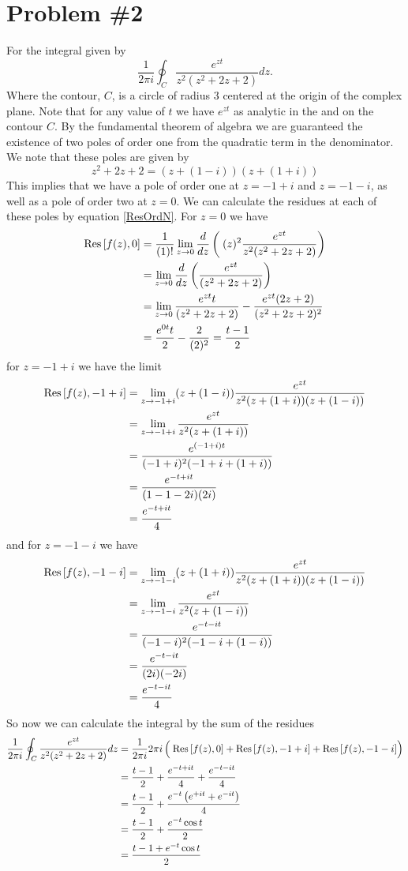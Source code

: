\documentclass[11pt]{article}
\numberwithin{equation}{section}
\begin{document}
\section{Problem \#2}
For the integral given by
$$\frac{1}{2\pi{i}}\oint_{C} \frac{e^{zt}}{z^2(z^2+2z+2)}dz.$$
Where the contour, $C$, is a circle of radius $3$ centered at the origin of the complex plane.
Note that for any value of $t$ we have $e^{zt}$ as analytic in the and on the contour $C$.
By the fundamental theorem of algebra we are guaranteed the existence of two poles of order 
one from the quadratic term in the denominator. We note that these poles are given by 
$$z^2+2z+2 = (z+(1-i))(z+(1+i))$$
This implies that we have a pole of order one at $z=-1+i$ and $z=-1-i$, as well as a pole of
order two at $z=0$. We can calculate the residues at each of these poles by equation 
\ref{ResOrdN}. For $z=0$ we have
\begin{align*}
\textnormal{Res}\left[{f(z)},{0}\right] &= \frac{1}{(1)!}\lim_{z\rightarrow{0}}\frac{d}{dz}\left(\frac{}{}(z)^2\frac{e^{zt}}{z^2(z^2+2z+2)}\right)\\
&= \lim_{z\rightarrow{0}}\frac{d}{dz}\left(\frac{e^{zt}}{(z^2+2z+2)}\right)\\
&= \lim_{z\rightarrow{0}}\frac{e^{zt}t}{(z^2+2z+2)}-\frac{e^{zt}(2z+2)}{(z^2+2z+2)^2}\\
&= \frac{e^{0t}t}{2}-\frac{2}{(2)^2} =\frac{t-1}{2}
\end{align*}
for $z=-1+i$ we have the limit
\begin{align*}
\textnormal{Res}\left[{f(z)},{-1+i}\right] &= \lim_{z\rightarrow{-1+i}}(z+(1-i))\frac{e^{zt}}{z^2(z+(1+i))(z+(1-i))}\\
&= \lim_{z\rightarrow{-1+i}}\frac{e^{zt}}{z^2(z+(1+i))}\\
&= \frac{e^{(-1+i)t}}{(-1+i)^2(-1+i+(1+i))}\\
&= \frac{e^{-t+it}}{(1-1-2i)(2i)}\\
&= \frac{e^{-t+it}}{4}
\end{align*}
and for $z=-1-i$ we have
\begin{align*}
\textnormal{Res}\left[{f(z)},{-1-i}\right] &= \lim_{z\rightarrow{-1-i}}(z+(1+i))\frac{e^{zt}}{z^2(z+(1+i))(z+(1-i))}\\
&= \lim_{z\rightarrow{-1-i}}\frac{e^{zt}}{z^2(z+(1-i))}\\
&= \frac{e^{-t-it}}{(-1-i)^2(-1-i+(1-i))}\\
&= \frac{e^{-t-it}}{(2i)(-2i)}\\
&= \frac{e^{-t-it}}{4}
\end{align*}
So now we can calculate the integral by the sum of the residues
\begin{align*}
\frac{1}{2\pi{i}}\oint_{C} \frac{e^{zt}}{z^2(z^2+2z+2)}dz &= \frac{1}{2\pi{i}}2\pi{i}\left(\frac{}{}\textnormal{Res}\left[{f(z)},{0}\right] + \textnormal{Res}\left[{f(z)},{-1+i}\right] + \textnormal{Res}\left[{f(z)},{-1-i}\right]\right)\\
&= \frac{t-1}{2} + \frac{e^{-t+it}}{4} + \frac{e^{-t-it}}{4}\\
&= \frac{t-1}{2} + \frac{e^{-t}\left(e^{+it}+e^{-it}\right)}{4}\\
&= \frac{t-1}{2} + \frac{e^{-t}\cos{t}}{2}\\
&= \frac{t-1+e^{-t}\cos{t}}{2}
\end{align*}
\end{document}
